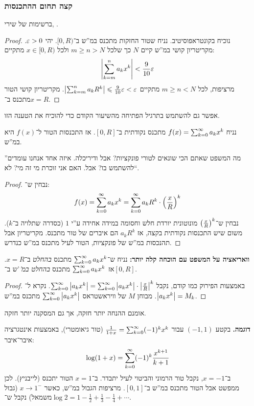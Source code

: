 \documentclass[name=רשימות חדו''א 2א]{../../../tex/classes/noChapterMegasumPreamble}
\begin{document}
\subsubsection{קצה תחום ההתכנסות}
	ברשימות של שירי, .
	\theo{נתון טור חזקות $\sumkoinf a_kx^{k}$ עם רדיוס התכנסות $0 < R \in \R$. אם הטור מתבדר ב־$x = R$, אז ההתכנסות של הטור ב־$[0, R)$ איננה במ''ש. }
	\begin{proof}נוכיח בקונטראפוסיטיב.
		נניח שטור החזקות מתכנס במ''ש ב־$[0, R)$. יהי $\eg > 0$. מקריטריון קושי במ''ש קיים $N$ כך שלכל $m \ge n > N$ ולכל $x \in [0, R)$ מתקיים:
		\[ \sof{\sum_{k = m}^{n}a_kx^{k}} < \frac{9}{10}\eg \]
		מרציפות, לכל $m \ge n < N$ מתקיים $\sof{\sum_{k = m}^{n} a_kR^{k}} \le \frac{9}{10}\eg < \eg$. מקריטריון קושי הטור מתכנס ב־$x = R$.
	\end{proof}

	אפשר גם להשתמש בתרגיל הפתיחה מהשיעור הקודם כדי להוכיח את הטענה הזו.

	\begin{Theorem}
		נניח $f(x) = \sum_{k = 0}^{\infty} a_kx^{k}$ מתכנס נקודתית ב־$[0, R]$. אז התכנסות הטור ל־$f(x)$ היא במ''ש.
	\end{Theorem}

	''מה המשפט שאתם הכי שונאים לטורי פונקציות? אבל ודיריכלה. איזה אחד אנחנו עומדים להשתמש בו? אבל. האם אני זוכרת מי זה מי? לא``.

	\begin{proof}
		נבחין ש־:
		\[ f(x) = \sum_{k = 0}^{\infty} a_kx^{k} = \sum_{k = 0}^{\infty} a_kR^{k} \cdot \left ( \frac{x}{R} \right )^{k} \]
	נבחין ש־$\left ( \frac{x}{R} \right )^{k}$ מונוטונית יורדת חלש וחסומה במידה אחידה ע''י $1$ (כסדרה שתלויה ב־$k$). משום שיש התכנסות נקודתית בקצה, אז $a_kR^{k}$ הם איברים של טור מתכנס. מקריטריון אבל תהנכסות במ''ש של פונקציות, הטור לעיל מתכנס במ''ש כנדרש.
	\end{proof}

	\textbf{וואריאציה על המשפט עם הוכחה קלה יותר: }נניח ש־$\sumkoinf a_kx^{k}$ מתכנס \textit{בהחלט} ב־$x = R$. אז $\sumkoinf a_kx^{k}$ מתכנס \textit{בהחלט במ'}'ש ב־$[0, R]$. \begin{proof}
		באמצעות הפירוק כמו קודם, נקבל $\sum_{k = 0}^{\infty} \left \lvert a_kx^{k} \right \rvert = \sum_{k = 0}^{\infty} \left \lvert a_kx^{k} \right \rvert \cdot \left \lvert \frac{x}{R} \right \rvert^{k}$.
		נקרא ל־$\left \lvert a_kx^{k} \right \rvert = M_k$. מבוחן $M$ של וויראשטראס $\sum_{k = 0}^{\infty} \left \lvert a_kx^{k} \right \rvert$ מתכנס במ''ש.
	\end{proof}

	אומנם ההנחה יותר חזקה, אך גם המסקנה יותר חזקה.

	\textbf{דוגמה. }בקטע $(-1, 1)$ עבור $\frac{1}{1 + x}  = \sum_{k = 0}^{\infty} (-1)^{k}x^{k}$ (טור גיאומטרי), באמצעות אינטגרציה איבר־איבר:
	\[ \log(1 + x) = \sum_{k = 0}^{\infty} (-1)^{k}\frac{x^{k + 1}}{k + 1} \]
	ב־$x = -1$, נקבל טור הרמוני והביטוי לעיל יתבדר. ב־$x =1$ הטור יתכנס (לייבניץ). לכן ממפשט אבל הטור מתכנס במ''ש ב־$[0, 1]$. מרציפות הגבול במ''ש, כאשר $x \to 1^{-}$ (גבול משמאל) נקבל ש־$\log 2 = 1 - \frac{1}{2} + \frac{1}{3} - \frac{1}{4} + \cdots$.
\end{document}
